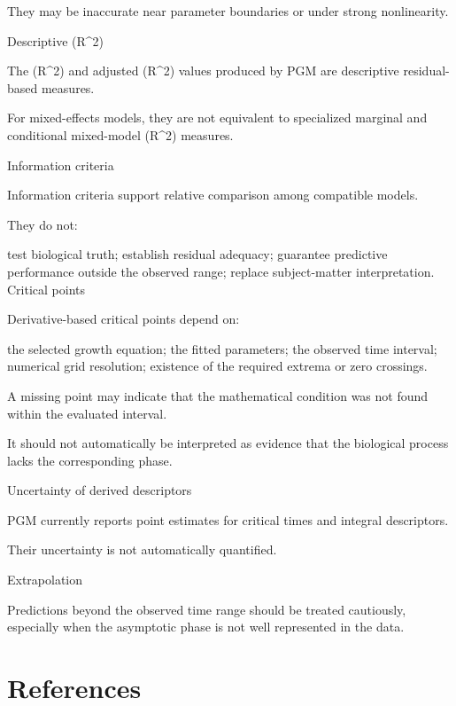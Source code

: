 \documentclass[
  english,
  letterpaper,
  DIV=11,
  numbers=noendperiod]{scrreprt}
\begin{document}
They may be inaccurate near parameter boundaries or under strong
nonlinearity.

Descriptive (R\^{}2)

The (R\^{}2) and adjusted (R\^{}2) values produced by PGM are
descriptive residual-based measures.

For mixed-effects models, they are not equivalent to specialized
marginal and conditional mixed-model (R\^{}2) measures.

Information criteria

Information criteria support relative comparison among compatible
models.

They do not:

test biological truth; establish residual adequacy; guarantee predictive
performance outside the observed range; replace subject-matter
interpretation. Critical points

Derivative-based critical points depend on:

the selected growth equation; the fitted parameters; the observed time
interval; numerical grid resolution; existence of the required extrema
or zero crossings.

A missing point may indicate that the mathematical condition was not
found within the evaluated interval.

It should not automatically be interpreted as evidence that the
biological process lacks the corresponding phase.

Uncertainty of derived descriptors

PGM currently reports point estimates for critical times and integral
descriptors.

Their uncertainty is not automatically quantified.

Extrapolation

Predictions beyond the observed time range should be treated cautiously,
especially when the asymptotic phase is not well represented in the
data.


\chapter*{References}\label{references}


\protect{}\label{refs}
\end{document}
